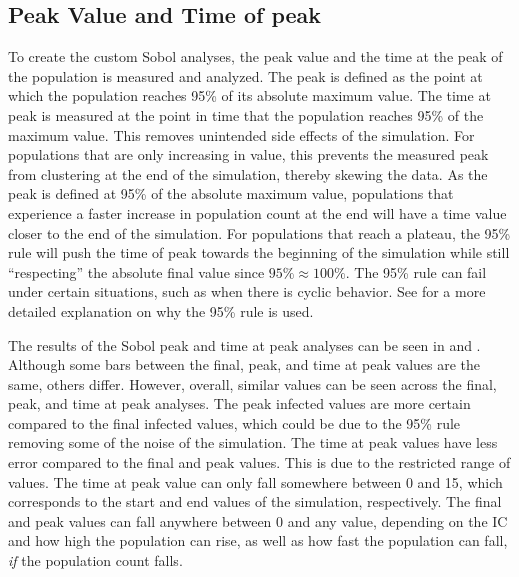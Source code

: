 \subsection{Peak Value and Time of peak}
To create the custom Sobol analyses, the peak value and the time at the peak of the population is measured and analyzed. 
The peak is defined as the point at which the population reaches 95\% of its absolute maximum value. 
The time at peak is measured at the point in time that the population reaches 95\% of the maximum value. 
This removes unintended side effects of the simulation. 
For populations that are only increasing in value, this prevents the measured peak from clustering at the end of the simulation, thereby skewing the data. 
As the peak is defined at 95\% of the absolute maximum value, populations that experience a faster increase in population count at the end will have a time value closer to the end of the simulation. 
For populations that reach a plateau, the 95\% rule will push the time of peak towards the beginning of the simulation while still “respecting” the absolute final value since $95\% \approx 100\%$. 
The 95\% rule can fail under certain situations, such as when there is cyclic behavior. 
See  for a more detailed explanation on why the 95\% rule is used. 

The results of the Sobol peak and time at peak analyses can be seen in  and . 
Although some bars between the final, peak, and time at peak values are the same, others differ. 
However, overall, similar values can be seen across the final, peak, and time at peak analyses. 
The peak infected values are more certain compared to the final infected values, which could be due to the 95\% rule removing some of the noise of the simulation. 
The time at peak values have less error compared to the final and peak values. 
This is due to the restricted range of values. The time at peak value can only fall somewhere between 0 and 15, which corresponds to the start and end values of the simulation, respectively. 
The final and peak values can fall anywhere between 0 and any value, depending on the IC and how high the population can rise, as well as how fast the population can fall, \textit{if} the population count falls. 

